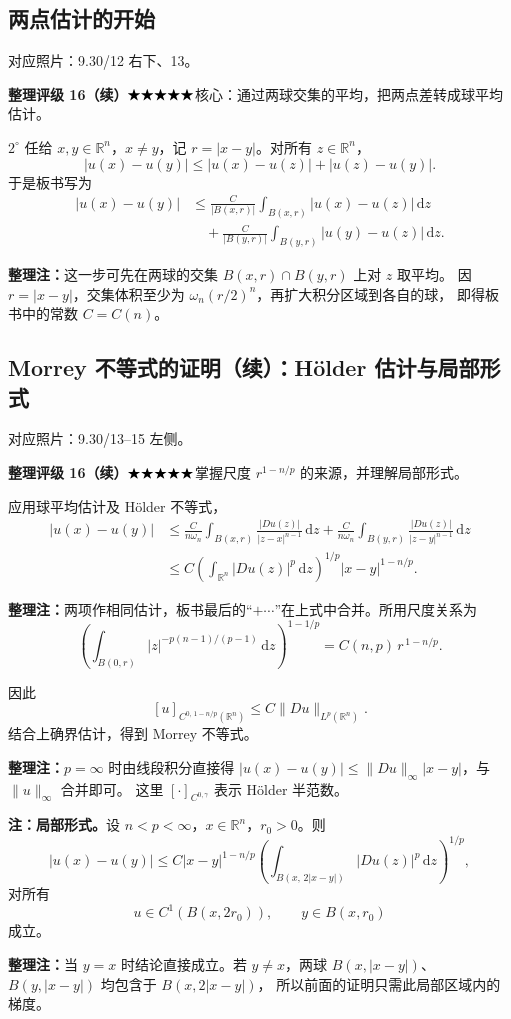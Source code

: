 \documentclass[UTF8,a4paper,11pt,fontset=fandol]{ctexart}
\newcommand{\R}{\mathbb R}
\newcommand{\dd}{\,\mathrm d}
\newcommand{\ednote}[1]{\par{\small\color{notegray}\textbf{整理注：}#1}\par}
\newcommand{\source}[1]{{\small\color{notegray}对应照片：#1。}\par}
\newcommand{\proofstars}[1]{\ensuremath{%
\ifnum#1>0\relax\bigstar\fi
\ifnum#1>1\relax\bigstar\fi
\ifnum#1>2\relax\bigstar\fi
\ifnum#1>3\relax\bigstar\fi
\ifnum#1>4\relax\bigstar\fi}}
\newcommand{\proofrating}[3]{\par{\small\color{proofblue}%
\textbf{整理评级 #1}\enspace\proofstars{#2}\quad #3\par}}
\begin{document}
\subsection*{两点估计的开始}
\source{9.30/12 右下、13}
\proofrating{16（续）}{5}{核心：通过两球交集的平均，把两点差转成球平均估计。}
$2^\circ$ 任给 $x,y\in\R^n$，$x\ne y$，记 $r=|x-y|$。对所有 $z\in\R^n$，
\[
|u(x)-u(y)|\leq|u(x)-u(z)|+|u(z)-u(y)|.
\]
于是板书写为
\[
\begin{aligned}
|u(x)-u(y)|
&\leq\frac{C}{|B(x,r)|}\int_{B(x,r)}|u(x)-u(z)|\dd z\\
&\quad+\frac{C}{|B(y,r)|}\int_{B(y,r)}|u(y)-u(z)|\dd z.
\end{aligned}
\]
\ednote{这一步可先在两球的交集 $B(x,r)\cap B(y,r)$ 上对 $z$ 取平均。
因 $r=|x-y|$，交集体积至少为 $\omega_n(r/2)^n$，再扩大积分区域到各自的球，
即得板书中的常数 $C=C(n)$。}

\newpage
\subsection*{Morrey 不等式的证明（续）：Hölder 估计与局部形式}
\source{9.30/13--15 左侧}
\proofrating{16（续）}{5}{掌握尺度 $r^{1-n/p}$ 的来源，并理解局部形式。}
应用球平均估计及 Hölder 不等式，
\[
\begin{aligned}
|u(x)-u(y)|
&\leq\frac{C}{n\omega_n}\int_{B(x,r)}
\frac{|Du(z)|}{|z-x|^{n-1}}\dd z
+\frac{C}{n\omega_n}\int_{B(y,r)}
\frac{|Du(z)|}{|z-y|^{n-1}}\dd z\\
&\leq C\left(\int_{\R^n}|Du(z)|^p\dd z\right)^{1/p}
|x-y|^{1-n/p}.
\end{aligned}
\]
\ednote{两项作相同估计，板书最后的“$+\cdots$”在上式中合并。所用尺度关系为
\[
\left(\int_{B(0,r)}|z|^{-p(n-1)/(p-1)}\dd z\right)^{1-1/p}
=C(n,p)\,r^{\,1-n/p}.
\]
}
因此
\[
[u]_{C^{0,\,1-n/p}(\R^n)}
\leq C\|Du\|_{L^p(\R^n)}.
\]
结合上确界估计，得到 Morrey 不等式。
\ednote{$p=\infty$ 时由线段积分直接得
$|u(x)-u(y)|\leq\|Du\|_\infty|x-y|$，与 $\|u\|_\infty$ 合并即可。
这里 $[\cdot]_{C^{0,\gamma}}$ 表示 Hölder 半范数。}

\textbf{注：局部形式。}设 $n<p<\infty$，$x\in\R^n$，$r_0>0$。则
\[
\boxed{|u(x)-u(y)|
\leq C|x-y|^{1-n/p}
\left(\int_{B(x,\,2|x-y|)}|Du(z)|^p\dd z\right)^{1/p},}
\]
对所有
\[
u\in C^1(B(x,2r_0)),\qquad y\in B(x,r_0)
\]
成立。
\begin{center}
\end{center}
\ednote{当 $y=x$ 时结论直接成立。若 $y\ne x$，两球
$B(x,|x-y|)$、$B(y,|x-y|)$ 均包含于 $B(x,2|x-y|)$，
所以前面的证明只需此局部区域内的梯度。}
\end{document}
